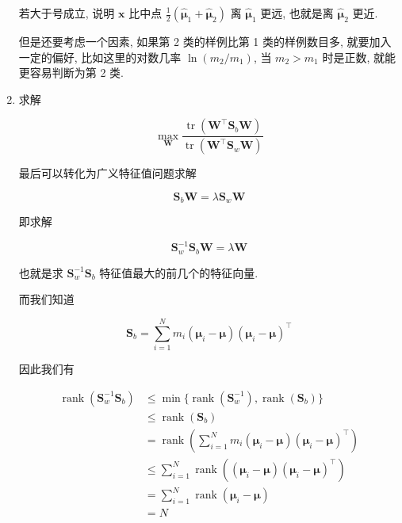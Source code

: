 \documentclass[answers]{exam}  %
\begin{document}
\begin{questions}
\begin{solution}
\begin{enumerate}
            若大于号成立, 说明 $\bm{x}$ 比中点 $\displaystyle \frac{1}{2}(\hat{\bm{\mu}}_{1}+\hat{\bm{\mu}}_{2})$ 离 $\hat{\bm{\mu}}_{1}$ 更远, 也就是离 $\hat{\bm{\mu}}_{2}$ 更近.

            但是还要考虑一个因素, 如果第 2 类的样例比第 1 类的样例数目多, 就要加入一定的偏好, 比如这里的对数几率 $\ln (m_2 / m_1)$, 当 $m_2 > m_1$ 时是正数, 就能更容易判断为第 2 类.

      \item

            求解

            $$
              \max_{\bm{W}} \frac{\operatorname{tr}(\bm{W}^{\top}\bm{S}_{b}\bm{W})}{\operatorname{tr}(\bm{W}^{\top}\bm{S}_{w}\bm{W})}
            $$

            最后可以转化为广义特征值问题求解

            $$
              \bm{S}_{b}\bm{W} = \lambda \bm{S}_{w}\bm{W}
            $$

            即求解

            $$
              \bm{S}_{w}^{-1}\bm{S}_{b}\bm{W} = \lambda \bm{W}
            $$

            也就是求 $\bm{S}_{w}^{-1}\bm{S}_{b}$ 特征值最大的前几个的特征向量.

            而我们知道

            $$
              \bm{S}_{b} = \sum_{i=1}^{N} m_{i}(\bm{\mu}_{i}-\bm{\mu})(\bm{\mu}_{i}-\bm{\mu})^{\top}
            $$

            因此我们有

            $$
              \begin{aligned}
                \operatorname{rank}(\bm{S}_{w}^{-1}\bm{S}_{b})
                 & \le \min\{ \operatorname{rank}(\bm{S}_{w}^{-1}), \operatorname{rank}(\bm{S}_{b}) \}              \\
                 & \le \operatorname{rank}(\bm{S}_{b})                                                              \\
                 & = \operatorname{rank}(\sum_{i=1}^{N} m_{i}(\bm{\mu}_{i}-\bm{\mu})(\bm{\mu}_{i}-\bm{\mu})^{\top}) \\
                 & \le \sum_{i=1}^{N} \operatorname{rank}((\bm{\mu}_{i}-\bm{\mu})(\bm{\mu}_{i}-\bm{\mu})^{\top})    \\
                 & = \sum_{i=1}^{N} \operatorname{rank}(\bm{\mu}_{i}-\bm{\mu})                                      \\
                 & = N                                                                                              \\
              \end{aligned}
            $$


\end{enumerate}
\end{solution}
\end{questions}
\end{document}
